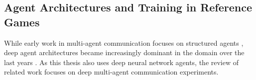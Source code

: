 \subsection{Agent Architectures and Training in Reference Games}
\label{multi_agent_arch}

While early work in multi-agent communication focuses on structured agents \parencite[e.~g.,~see][for reviews]{christiansen2003language, cangelosi2002symbol}, deep agent architectures became increasingly dominant in the domain over the last years \parencite{lazaridou2020emergent}. As this thesis also uses deep neural network agents, the review of related work focuses on deep multi-agent communication experiments. 


